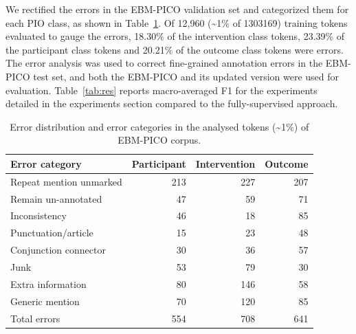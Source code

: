 \documentclass[10.7pt,]{article}
\begin{document}
%
We rectified the errors in the EBM-PICO validation set and categorized them for each PIO class, as shown in Table~\ref{tab:errordist}.
Of 12,960 (\textasciitilde1\% of 1303169) training tokens evaluated to gauge the errors, 18.30\% of the intervention class tokens, 23.39\% of the participant class tokens and 20.21\% of the outcome class tokens were errors.
The error analysis was used to correct fine-grained annotation errors in the EBM-PICO test set, and both the EBM-PICO and its updated version were used for evaluation.
Table~\ref{tab:res} reports macro-averaged F1 for the experiments detailed in the experiments section compared to the fully-supervised approach.
%
\begin{table}[!ht]
    \centering
    \begin{tabular}{|l|r|r|r|}
    \hline
        Error category & Participant & Intervention & Outcome \\ \hline
        Repeat mention unmarked & 213 & 227 & 207 \\ 
        Remain un-annotated & 47 & 59 & 71 \\ 
        Inconsistency & 46 & 18 & 85 \\ 
        Punctuation/article & 15 & 23 & 48 \\ 
        Conjunction connector & 30 & 36 & 57 \\ 
        Junk & 53 & 79 & 30 \\ 
        Extra information & 80 & 146 & 58 \\ 
        Generic mention & 70 & 120 & 85 \\ \hline
        Total errors & 554 & 708 & 641 \\ \hline
    \end{tabular}
    \caption{\label{tab:errordist} Error distribution and error categories in the analysed tokens (\textasciitilde1\%) of EBM-PICO corpus.}
\end{table}
%
\end{document}
